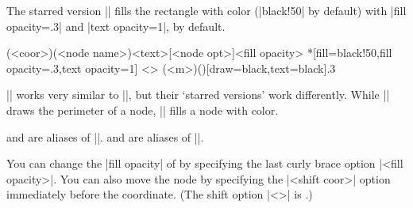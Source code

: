 \begin{tzcode}{.3}
\end{tzcode}

The starred version |\tznodeframe*| fills the rectangle with color (|black!50| by default) with |fill opacity=.3| and |text opacity=1|, by default.


\begin{tzdef}
             (<coor>)(<node name>){<text>}[<node opt>]{<fill opacity>}
 *[fill=black!50,fill opacity=.3,text opacity=1] <>
  (<m>)(){}[draw=black,text=black]{.3}
\end{tzdef}

\remark
|\tznodeframe| works very similar to |\tznode|, but their `starred versions' work differently.
While |\tznode*| draws the perimeter of a node, |\tznodeframe*| fills a node with color.

\begin{tzcode}{.3}
\end{tzcode}

\icmd{\tznoderectangle} and \icmd{\tznodebox} are aliases of |\tznodeframe|.
\icmd{\tznoderectangle*} and \icmd{\tznodebox*} are aliases of |\tznodeframe*|.


You can change the |fill opacity| of \icmd{\tznodeframe*} by specifying the last curly brace option |{<fill opacity>}|. You can also move the node by specifying the |<shift coor>| option immediately before the coordinate.
(The  shift option |<>| is .)


\begin{tzcode}{.3}
\end{tzcode}

